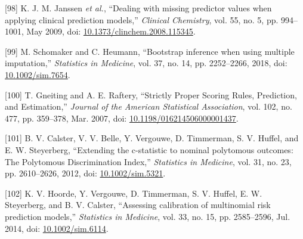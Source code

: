 \documentclass[12pt,PhD,twoside,openright]{muthesis}
\newenvironment{cslreferences}%
  {}%
  {\par}
\begin{document}
\begin{cslreferences}
\leavevmode\hypertarget{ref-janssen_dealing_2009}{}%
{[}98{]} K. J. M. Janssen \emph{et al.}, ``Dealing with missing predictor values when applying clinical prediction models,'' \emph{Clinical Chemistry}, vol. 55, no. 5, pp. 994--1001, May 2009, doi: \href{https://doi.org/10.1373/clinchem.2008.115345}{10.1373/clinchem.2008.115345}.

\leavevmode\hypertarget{ref-schomaker_bootstrap_2018}{}%
{[}99{]} M. Schomaker and C. Heumann, ``Bootstrap inference when using multiple imputation,'' \emph{Statistics in Medicine}, vol. 37, no. 14, pp. 2252--2266, 2018, doi: \href{https://doi.org/10.1002/sim.7654}{10.1002/sim.7654}.

\leavevmode\hypertarget{ref-gneiting_strictly_2007}{}%
{[}100{]} T. Gneiting and A. E. Raftery, ``Strictly Proper Scoring Rules, Prediction, and Estimation,'' \emph{Journal of the American Statistical Association}, vol. 102, no. 477, pp. 359--378, Mar. 2007, doi: \href{https://doi.org/10.1198/016214506000001437}{10.1198/016214506000001437}.

\leavevmode\hypertarget{ref-calster_extending_2012-1}{}%
{[}101{]} B. V. Calster, V. V. Belle, Y. Vergouwe, D. Timmerman, S. V. Huffel, and E. W. Steyerberg, ``Extending the c-statistic to nominal polytomous outcomes: The Polytomous Discrimination Index,'' \emph{Statistics in Medicine}, vol. 31, no. 23, pp. 2610--2626, 2012, doi: \href{https://doi.org/10.1002/sim.5321}{10.1002/sim.5321}.

\leavevmode\hypertarget{ref-hoorde_assessing_2014}{}%
{[}102{]} K. V. Hoorde, Y. Vergouwe, D. Timmerman, S. V. Huffel, E. W. Steyerberg, and B. V. Calster, ``Assessing calibration of multinomial risk prediction models,'' \emph{Statistics in Medicine}, vol. 33, no. 15, pp. 2585--2596, Jul. 2014, doi: \href{https://doi.org/10.1002/sim.6114}{10.1002/sim.6114}.
\end{cslreferences}
\end{document}
